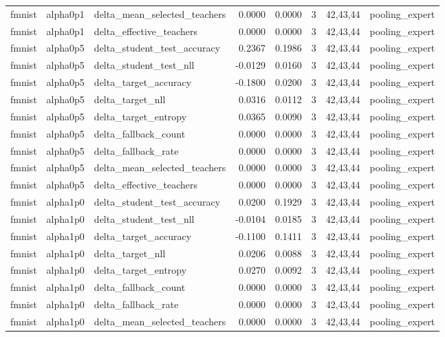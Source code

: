 \begin{tabular}{lllrrrll}
fmnist & alpha0p1 & delta\_mean\_selected\_teachers & 0.0000 & 0.0000 & 3 & 42,43,44 & pooling\_expert \\
fmnist & alpha0p1 & delta\_effective\_teachers & 0.0000 & 0.0000 & 3 & 42,43,44 & pooling\_expert \\
fmnist & alpha0p5 & delta\_student\_test\_accuracy & 0.2367 & 0.1986 & 3 & 42,43,44 & pooling\_expert \\
fmnist & alpha0p5 & delta\_student\_test\_nll & -0.0129 & 0.0160 & 3 & 42,43,44 & pooling\_expert \\
fmnist & alpha0p5 & delta\_target\_accuracy & -0.1800 & 0.0200 & 3 & 42,43,44 & pooling\_expert \\
fmnist & alpha0p5 & delta\_target\_nll & 0.0316 & 0.0112 & 3 & 42,43,44 & pooling\_expert \\
fmnist & alpha0p5 & delta\_target\_entropy & 0.0365 & 0.0090 & 3 & 42,43,44 & pooling\_expert \\
fmnist & alpha0p5 & delta\_fallback\_count & 0.0000 & 0.0000 & 3 & 42,43,44 & pooling\_expert \\
fmnist & alpha0p5 & delta\_fallback\_rate & 0.0000 & 0.0000 & 3 & 42,43,44 & pooling\_expert \\
fmnist & alpha0p5 & delta\_mean\_selected\_teachers & 0.0000 & 0.0000 & 3 & 42,43,44 & pooling\_expert \\
fmnist & alpha0p5 & delta\_effective\_teachers & 0.0000 & 0.0000 & 3 & 42,43,44 & pooling\_expert \\
fmnist & alpha1p0 & delta\_student\_test\_accuracy & 0.0200 & 0.1929 & 3 & 42,43,44 & pooling\_expert \\
fmnist & alpha1p0 & delta\_student\_test\_nll & -0.0104 & 0.0185 & 3 & 42,43,44 & pooling\_expert \\
fmnist & alpha1p0 & delta\_target\_accuracy & -0.1100 & 0.1411 & 3 & 42,43,44 & pooling\_expert \\
fmnist & alpha1p0 & delta\_target\_nll & 0.0206 & 0.0088 & 3 & 42,43,44 & pooling\_expert \\
fmnist & alpha1p0 & delta\_target\_entropy & 0.0270 & 0.0092 & 3 & 42,43,44 & pooling\_expert \\
fmnist & alpha1p0 & delta\_fallback\_count & 0.0000 & 0.0000 & 3 & 42,43,44 & pooling\_expert \\
fmnist & alpha1p0 & delta\_fallback\_rate & 0.0000 & 0.0000 & 3 & 42,43,44 & pooling\_expert \\
fmnist & alpha1p0 & delta\_mean\_selected\_teachers & 0.0000 & 0.0000 & 3 & 42,43,44 & pooling\_expert \\

\end{tabular}
